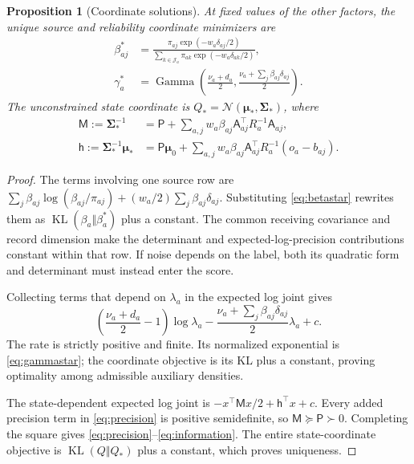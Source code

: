 \documentclass[11pt]{article}
\newtheorem{proposition}[theorem]{Proposition}
\newcommand{\KL}{\operatorname{KL}}
\newcommand{\Ga}{\operatorname{Gamma}}
\newcommand{\m}{\boldsymbol{\mu}}
\newcommand{\Sig}{\boldsymbol{\Sigma}}
\begin{document}
\begin{proposition}[Coordinate solutions]
\label{prop:coordinates}
At fixed values of the other factors, the unique source and reliability coordinate minimizers are
\begin{align}
\beta_{aj}^*&=\frac{\pi_{aj}\exp(-w_a\delta_{aj}/2)}
 {\sum_{k\in\mathcal J_a}\pi_{ak}\exp(-w_a\delta_{ak}/2)},
\label{eq:betastar}\\
\gamma_a^*&=\Ga\left(\frac{\nu_a+d_a}{2},
 \frac{\nu_a+\sum_j\beta_{aj}\delta_{aj}}2\right).
\label{eq:gammastar}
\end{align}
The unconstrained state coordinate is $Q_* =\mathcal N(\m_*,\Sig_*)$, where
\begin{align}
\mathsf M:=\Sig_*^{-1}
 &=\mathsf P+\sum_{a,j}w_a\beta_{aj}\mathsf A_{aj}^{\top}R_a^{-1}\mathsf A_{aj},
\label{eq:precision}\\
\mathsf h:=\Sig_*^{-1}\m_*
 &=\mathsf P\m_0+\sum_{a,j}w_a\beta_{aj}\mathsf A_{aj}^{\top}R_a^{-1}(o_a-b_{aj}).
\label{eq:information}
\end{align}
\end{proposition}
\begin{proof}
The terms involving one source row are $\sum_j\beta_{aj}\log(\beta_{aj}/\pi_{aj})+(w_a/2)\sum_j\beta_{aj}\delta_{aj}$. Substituting \eqref{eq:betastar} rewrites them as $\KL(\beta_a\Vert\beta_a^*)$ plus a constant. The common receiving covariance and record dimension make the determinant and expected-log-precision contributions constant within that row. If noise depends on the label, both its quadratic form and determinant must instead enter the score.

Collecting terms that depend on $\lambda_a$ in the expected log joint gives
\begin{equation}
\left(\frac{\nu_a+d_a}{2}-1\right)\log\lambda_a
-\frac{\nu_a+\sum_j\beta_{aj}\delta_{aj}}2\lambda_a+c.
\label{eq:gammacollect}
\end{equation}
The rate is strictly positive and finite. Its normalized exponential is \eqref{eq:gammastar}; the coordinate objective is its KL plus a constant, proving optimality among admissible auxiliary densities.

The state-dependent expected log joint is $-x^\top\mathsf M x/2+\mathsf h^\top x+c$. Every added precision term in \eqref{eq:precision} is positive semidefinite, so $\mathsf M\succeq\mathsf P\succ0$. Completing the square gives \eqref{eq:precision}--\eqref{eq:information}. The entire state-coordinate objective is $\KL(Q\Vert Q_*)$ plus a constant, which proves uniqueness.
\end{proof}
\end{document}
